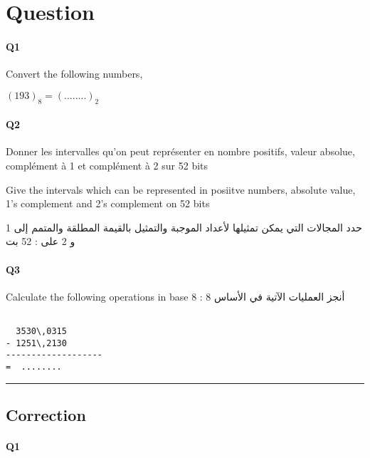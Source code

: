 
\section{Question}


\paragraph{Q1}






Convert the following numbers, \hfill{}

$(193)_{ 8 } = (........)_{ 2}$



\paragraph{Q2}

Donner les intervalles qu'on peut représenter en nombre positifs, valeur absolue, complément à 1 et complément à 2  sur 52 bits

Give the intervals which can be represented in posiitve numbers, absolute value, 1's complement and 2's complement on 52 bits

\begin{arab}[utf]
حدد المجالات التي يمكن تمثيلها لأعداد الموجبة والتمثيل بالقيمة المطلقة والمتمم إلى 1 و 2 على   : 52 بت
\end{arab}



\paragraph{Q3}

Calculate  the following operations in base 8 :  أنجز العمليات الآتية في الأساس 8

\begin{verbatim}

  3530\,0315
- 1251\,2130
-------------------
=  ........

\end{verbatim}


\hrule width 1\linewidth
\pagebreak

\subsection{Correction}


\paragraph{Q1}






